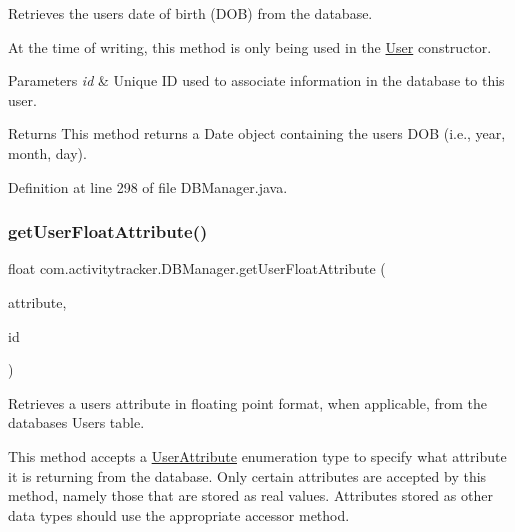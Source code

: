 Retrieves the user\textquotesingle{}s date of birth (D\+OB) from the database.

At the time of writing, this method is only being used in the \mbox{\hyperlink{classcom_1_1activitytracker_1_1_user}{User}} constructor.


\begin{DoxyParams}{Parameters}
{\em id} & Unique ID used to associate information in the database to this user.\\
\hline
\end{DoxyParams}
\begin{DoxyReturn}{Returns}
This method returns a Date object containing the user\textquotesingle{}s D\+OB (i.\+e., year, month, day). 
\end{DoxyReturn}


Definition at line 298 of file D\+B\+Manager.\+java.

\mbox{\label{classcom_1_1activitytracker_1_1_d_b_manager_a98df66254bec4d74b29cfe468a9fc794}} 
\subsubsection{\texorpdfstring{get\+User\+Float\+Attribute()}{getUserFloatAttribute()}}
{\footnotesize\ttfamily float com.\+activitytracker.\+D\+B\+Manager.\+get\+User\+Float\+Attribute (\begin{DoxyParamCaption}\item[{final \mbox{\hyperlink{enumcom_1_1activitytracker_1_1_user_attribute}{User\+Attribute}}}]{attribute,  }\item[{final int}]{id }\end{DoxyParamCaption})}

Retrieves a user\textquotesingle{}s attribute in floating point format, when applicable, from the database\textquotesingle{}s Users table.

This method accepts a \mbox{\hyperlink{enumcom_1_1activitytracker_1_1_user_attribute}{User\+Attribute}} enumeration type to specify what attribute it is returning from the database. Only certain attributes are accepted by this method, namely those that are stored as real values. Attributes stored as other data types should use the appropriate accessor method.


